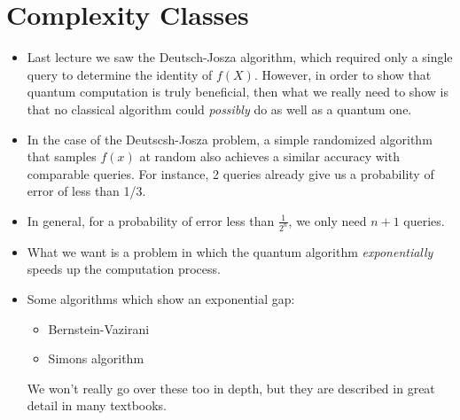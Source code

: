 \section{Complexity Classes}
\begin{itemize}
	\item Last lecture we saw the Deutsch-Josza algorithm, which required only a single query to determine the identity
		of \( f(X) \). However, in order to show that quantum computation is truly beneficial, then what we really 
		need to show is that no classical algorithm could \textit{possibly} do as well as a quantum one. 
	\item In the case of the Deutscsh-Josza problem, a simple randomized algorithm that samples \( f(x) \) at random 
		also achieves a similar accuracy with comparable queries. For instance, 2 queries already give us a 
		probability of error of less than 1/3.
	\item In general, for a probability of error less than \( \frac{1}{2^{n}} \), we only need \( n+1 \) queries.   
	\item What we want is a problem in which the quantum algorithm \textit{exponentially} speeds up
		the computation process. 
	\item Some algorithms which show an exponential gap:
		\begin{itemize}
			\item Bernstein-Vazirani
			\item Simons algorithm 
		\end{itemize}
		We won't really go over these too in depth, but they are described in great detail in many textbooks.  
\end{itemize}
